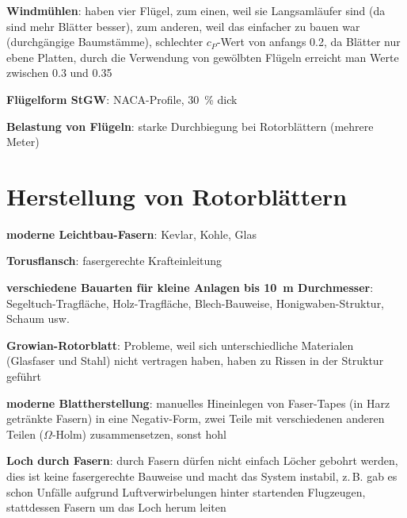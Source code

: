 \textbf{Windmühlen}:
haben vier Flügel, zum einen, weil sie Langsamläufer sind (da sind mehr Blätter besser),
zum anderen, weil das einfacher zu bauen war (durchgängige Baumstämme),
schlechter $c_P$-Wert von anfangs \num{0.2}, da Blätter nur ebene Platten,
durch die Verwendung von gewölbten Flügeln erreicht man Werte zwischen \num{0.3} und \num{0.35}

\textbf{Flügelform StGW}:
NACA-Profile, \SI{30}{\percent} dick

\textbf{Belastung von Flügeln}:
starke Durchbiegung bei Rotorblättern (mehrere Meter)

\pagebreak

\section{%
    Herstellung von Rotorblättern%
}

\textbf{moderne Leichtbau-Fasern}:
Kevlar, Kohle, Glas

\textbf{Torusflansch}: fasergerechte Krafteinleitung

\textbf{verschiedene Bauarten für kleine Anlagen bis \SI{10}{\meter} Durchmesser}:\\
Segeltuch-Tragfläche,
Holz-Tragfläche,
Blech-Bauweise,
Honigwaben-Struktur,
Schaum usw.

\textbf{Growian-Rotorblatt}:
Probleme, weil sich unterschiedliche Materialen (Glasfaser und Stahl) nicht vertragen haben,
haben zu Rissen in der Struktur geführt

\textbf{moderne Blattherstellung}:
manuelles Hineinlegen von Faser-Tapes (in Harz getränkte Fasern) in eine Negativ-Form,
zwei Teile mit verschiedenen anderen Teilen ($\Omega$-Holm) zusammensetzen, sonst hohl

\textbf{Loch durch Fasern}:
durch Fasern dürfen nicht einfach Löcher gebohrt werden,
dies ist keine fasergerechte Bauweise und macht das System instabil,
z.\,B. gab es schon Unfälle aufgrund Luftverwirbelungen hinter startenden Flugzeugen,
stattdessen Fasern um das Loch herum leiten

\pagebreak
